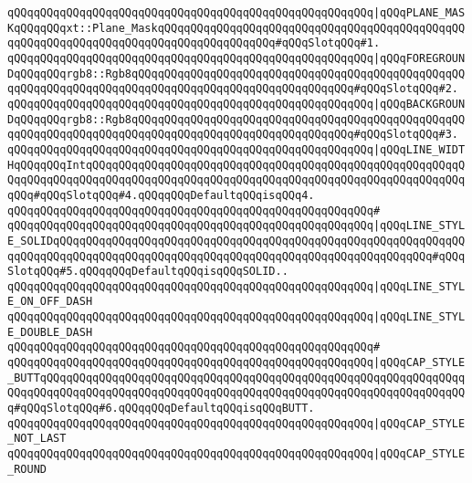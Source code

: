 \verb|qQQqqQQqqQQqqQQqqQQqqQQqqQQqqQQqqQQqqQQqqQQqqQQqqQQqqQQq|\verb#|qQQqPLANE_MASKqQQqqQQqxt::Plane_MaskqQQqqQQqqQQqqQQqqQQqqQQqqQQqqQQqqQQqqQQqqQQqqQQqqQQqqQQqqQQqqQQqqQQqqQQqqQQqqQQqqQQqqQQq#\verb|#qQQqSlotqQQq#1.|\newline
\verb|qQQqqQQqqQQqqQQqqQQqqQQqqQQqqQQqqQQqqQQqqQQqqQQqqQQqqQQq|\verb#|qQQqFOREGROUNDqQQqqQQqrgb8::Rgb8qQQqqQQqqQQqqQQqqQQqqQQqqQQqqQQqqQQqqQQqqQQqqQQqqQQqqQQqqQQqqQQqqQQqqQQqqQQqqQQqqQQqqQQqqQQqqQQqqQQqqQQq#\verb|#qQQqSlotqQQq#2.|\newline
\verb|qQQqqQQqqQQqqQQqqQQqqQQqqQQqqQQqqQQqqQQqqQQqqQQqqQQqqQQq|\verb#|qQQqBACKGROUNDqQQqqQQqrgb8::Rgb8qQQqqQQqqQQqqQQqqQQqqQQqqQQqqQQqqQQqqQQqqQQqqQQqqQQqqQQqqQQqqQQqqQQqqQQqqQQqqQQqqQQqqQQqqQQqqQQqqQQqqQQq#\verb|#qQQqSlotqQQq#3.|\newline
\verb|qQQqqQQqqQQqqQQqqQQqqQQqqQQqqQQqqQQqqQQqqQQqqQQqqQQqqQQq|\verb#|qQQqLINE_WIDTHqQQqqQQqIntqQQqqQQqqQQqqQQqqQQqqQQqqQQqqQQqqQQqqQQqqQQqqQQqqQQqqQQqqQQqqQQqqQQqqQQqqQQqqQQqqQQqqQQqqQQqqQQqqQQqqQQqqQQqqQQqqQQqqQQqqQQqqQQqqQQq#\verb|#qQQqSlotqQQq#4.qQQqqQQqDefaultqQQqisqQQq4.|\newline
\verb|qQQqqQQqqQQqqQQqqQQqqQQqqQQqqQQqqQQqqQQqqQQqqQQqqQQqqQQq#|\newline
\verb|qQQqqQQqqQQqqQQqqQQqqQQqqQQqqQQqqQQqqQQqqQQqqQQqqQQqqQQq|\verb#|qQQqLINE_STYLE_SOLIDqQQqqQQqqQQqqQQqqQQqqQQqqQQqqQQqqQQqqQQqqQQqqQQqqQQqqQQqqQQqqQQqqQQqqQQqqQQqqQQqqQQqqQQqqQQqqQQqqQQqqQQqqQQqqQQqqQQqqQQqqQQqqQQq#\verb|#qQQqSlotqQQq#5.qQQqqQQqDefaultqQQqisqQQqSOLID..|\newline
\verb|qQQqqQQqqQQqqQQqqQQqqQQqqQQqqQQqqQQqqQQqqQQqqQQqqQQqqQQq|\verb#|qQQqLINE_STYLE_ON_OFF_DASH#\newline
\verb|qQQqqQQqqQQqqQQqqQQqqQQqqQQqqQQqqQQqqQQqqQQqqQQqqQQqqQQq|\verb#|qQQqLINE_STYLE_DOUBLE_DASH#\newline
\verb|qQQqqQQqqQQqqQQqqQQqqQQqqQQqqQQqqQQqqQQqqQQqqQQqqQQqqQQq#|\newline
\verb|qQQqqQQqqQQqqQQqqQQqqQQqqQQqqQQqqQQqqQQqqQQqqQQqqQQqqQQq|\verb#|qQQqCAP_STYLE_BUTTqQQqqQQqqQQqqQQqqQQqqQQqqQQqqQQqqQQqqQQqqQQqqQQqqQQqqQQqqQQqqQQqqQQqqQQqqQQqqQQqqQQqqQQqqQQqqQQqqQQqqQQqqQQqqQQqqQQqqQQqqQQqqQQqqQQqqQQq#\verb|#qQQqSlotqQQq#6.qQQqqQQqDefaultqQQqisqQQqBUTT.|\newline
\verb|qQQqqQQqqQQqqQQqqQQqqQQqqQQqqQQqqQQqqQQqqQQqqQQqqQQqqQQq|\verb#|qQQqCAP_STYLE_NOT_LAST#\newline
\verb|qQQqqQQqqQQqqQQqqQQqqQQqqQQqqQQqqQQqqQQqqQQqqQQqqQQqqQQq|\verb#|qQQqCAP_STYLE_ROUND#\newline
